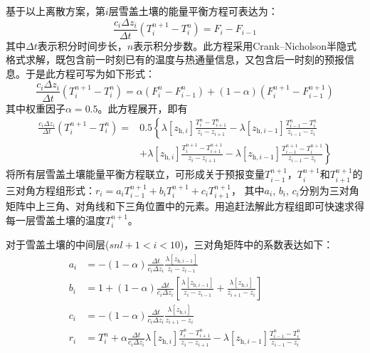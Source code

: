 基于以上离散方案，第$i$层雪盖土壤的能量平衡方程可表达为：
\begin{equation}
  \frac{c_{i} \Delta z_{i}}{\Delta t}\left(T_{i}^{n+1}-T_{i}^{n}\right)=F_{i}-F_{i-1}
\end{equation}
%
其中$\Delta t$表示积分时间步长，$n$表示积分步数。此方程采用Crank--Nicholson半隐式格式求解，既包含前一时刻已有的温度与热通量信息，又包含后一时刻的预报信息。于是此方程可写为如下形式：
\begin{equation}
  \frac{c_{i} \Delta z_{i}}{\Delta t}\left(T_{i}^{n+1}-T_{i}^{n}\right)=\alpha\left(F_{i}^{n}-F_{i-1}^{n}\right)+(1-\alpha)\left(F_{i}^{n+1}-F_{i-1}^{n+1}\right)
\end{equation}
其中权重因子$\alpha=0.5$。此方程展开，即有
\begin{equation}
  \begin{aligned}
    \frac{c_{i} \Delta z_{i}}{\Delta t}\left(T_{i}^{n+1}-T_{i}^{n}\right)=& 0.5\left\{\lambda\left[z_{\mathrm{h},i}\right] \frac{T_{i}^{n}-T_{i+1}^{n}}{z_{i}-z_{i+1}}-\lambda\left[z_{\mathrm{h},i-1}\right] \frac{T_{i-1}^{n}-T_{i}^{n}}{z_{i-1}-z_{i}}\right.\\[1ex] &\left.+\lambda\left[z_{\mathrm{h},i}\right] \frac{T_{i}^{n+1}-T_{i+1}^{n+1}}{z_{i}-z_{i+1}}-\lambda\left[z_{\mathrm{h},i-1}\right] \frac{T_{i-1}^{n+1}-T_{i}^{n+1}}{z_{i-1}-z_{i}}\right\}
  \end{aligned}
\end{equation}
将所有层雪盖土壤能量平衡方程联立，可形成关于预报变量$T_{i-1}^{n+1}$，$T_i^{n+1}$和$T_{i+1}^{n+1}$的三对角方程组形式：$r_i=a_iT_{i-1}^{n+1}+b_iT_i^{n+1}+c_iT_{i+1}^{n+1}$，
其中$a_i$, $b_i$, $c_i$分别为三对角矩阵中上三角、对角线和下三角位置中的元素。用追赶法解此方程组即可快速求得每一层雪盖土壤的温度$T_i^{n+1}$。


对于雪盖土壤的中间层($snl+1<i<10$)，三对角矩阵中的系数表达如下：
\begin{equation}
  \begin{aligned}
    a_{i} &= -(1-\alpha) \frac{\Delta t}{c_{i} \Delta z_{i}} \frac{\lambda\left[z_{\mathrm{h},i-1}\right]}{z_{i}-z_{i-1}} \\[1ex]
    b_{i} &= 1+(1-\alpha) \frac{\Delta t}{c_{i} \Delta z_{i}}\left[\frac{\lambda\left[z_{\mathrm{h},i-1}\right]}{z_{i}-z_{i-1}}+\frac{\lambda\left[z_{\mathrm{h},i}\right]}{z_{i+1}-z_{i}}\right] \\[1ex]
    c_{i} &= -(1-\alpha) \frac{\Delta t}{c_{i} \Delta z_{i}} \frac{\lambda\left[z_{\mathrm{h},i}\right]}{z_{i+1}-z_{i}} \\[1ex]
    r_{i} &= T_{i}^{n}+\alpha \frac{\Delta t}{c_{i} \Delta z_{i}} \lambda\left[z_{\mathrm{h},i}\right] \frac{T_{i}^{n}-T_{i+1}^{n}}{z_{i}-z_{i+1}}-\lambda\left[z_{\mathrm{h},i-1}\right] \frac{T_{i-1}^{n}-T_{i}^{n}}{z_{i-1}-z_{i}}
  \end{aligned}
\end{equation}

